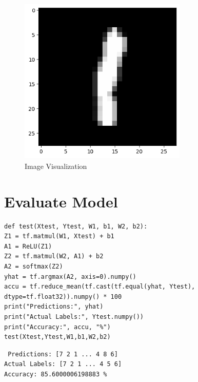 \vspace{-1cm}
    \begin{figure}[h!]
        \centering
        \includegraphics[width=8cm, height=8cm]{ass6pic2.png}
        \caption{Image Visualization}
        \label{fig:image_visualization}
    \end{figure}         

    \vspace{-.3cm}  

\section{Evaluate Model}
\begin{lstlisting}
def test(Xtest, Ytest, W1, b1, W2, b2):
Z1 = tf.matmul(W1, Xtest) + b1
A1 = ReLU(Z1)
Z2 = tf.matmul(W2, A1) + b2
A2 = softmax(Z2)
yhat = tf.argmax(A2, axis=0).numpy()
accu = tf.reduce_mean(tf.cast(tf.equal(yhat, Ytest), dtype=tf.float32)).numpy() * 100
print("Predictions:", yhat)
print("Actual Labels:", Ytest.numpy())
print("Accuracy:", accu, "%")
test(Xtest,Ytest,W1,b1,W2,b2)
\end{lstlisting}
\begin{verbatim}
 Predictions: [7 2 1 ... 4 8 6]
Actual Labels: [7 2 1 ... 4 5 6]
Accuracy: 85.6000006198883 %
\end{verbatim}
\newpage
